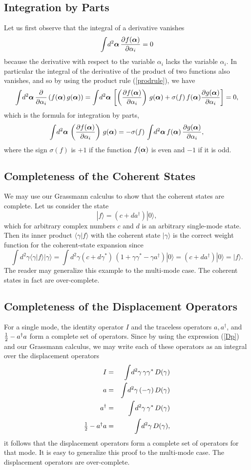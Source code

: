 \documentclass[12pt]{article}
\def\beq{\begin{equation}}
\def\eeq{\end{equation}}
\def\bea{\begin{eqnarray}}
\def\eea{\end{eqnarray}}
\def\p{\partial}
\def\a{\alpha}
\def\ba{{\mbox{\boldmath$\alpha$}}}
\def\ad{a^\dgr}
\def\c{\gamma}
\def\cs{\gamma^*}
\def\s{\sigma}
\def\dgr{\dagger}
\def\thalf{\textstyle{ {1 \over 2} } }
\def\G{Grassmann }
\def\cost{coherent state }
\def\costs{coherent states }
\def\co_st{coherent-state}
\def\disp{displacement }
\def\ops{operators }
\def\opsp{operators}
\begin{document}
\subsection{Integration by Parts}
Let us first observe that the 
integral of a derivative vanishes
\beq
\int \! d^2\ba \, \frac { \p f( \ba ) }{ \p \a_i } = 0 
\label {intofder0}
\eeq
because the derivative  with respect to 
the variable $ \a_i $ lacks the variable $ \a_i $.
In particular the integral of the derivative 
of the product of two functions also vanishes,
and so by using the product rule (\ref {prodrule}),
we have
\beq
\int \! d^2\ba \, \frac { \p }{ \p \a_i } \left( f( \ba ) 
\, g( \ba ) \right) = \int \! d^2\ba \, \left[
\left( \frac { \p f( \ba ) }{ \p \a_i } \right)
\, g( \ba ) + \s( f ) \,  f( \ba ) \frac { \p g( \ba ) }{ \p \a_i } 
\right] = 0 ,
\label {intofderp}
\eeq
which is the formula for integration by parts,
\beq
\int \! d^2\ba \, \left( \frac { \p f( \ba ) }{ \p \a_i } \right)
\, g( \ba ) =
- \s( f ) \, \int \! d^2\ba \,  f( \ba ) \,
\frac { \p g( \ba ) }{ \p \a_i } ,
\label {intbyparts}
\eeq
where the sign $ \s( f ) $ is $ +1 $ 
if the function $ f( \ba ) $ is even
and $ -1 $ if it is odd.

\subsection{Completeness of the Coherent States}
We may use our \G calculus to show that the
\costs are complete.  Let us consider the state 
\beq
| f \rangle = \left( c + d \ad \right) | 0 \rangle ,
\label {arbst}
\eeq
which for arbitrary complex numbers $ c $ and $ d $
is an arbitrary single-mode state.
Then its inner product $ \langle \c | f \rangle $
with the \cost $ | \c \rangle $ is the correct
weight function for the \co_st expansion
since
\beq
\int \! d^2\c \langle \c | f \rangle | \c \rangle =
\int \! d^2\c ( c + d \cs ) 
\, \left( 1 + \c \cs - \c \ad \right) | 0 \rangle 
= \left( c + d \ad \right) | 0 \rangle
= | f \rangle .
\label {co_stcompl}
\eeq
The reader may generalize this example to the
multi-mode case.  The coherent states in fact
are over-complete.

\subsection{Completeness of the Displacement Operators}
For a single mode, the identity operator $ I $ 
and the traceless \ops $ a, \ad $, 
and $ \thalf - \ad a $ form a complete set of \opsp.
Since by using the expression (\ref {Dp})
and our \G calculus,
we may write each of these \ops
as an integral over the \disp \ops
\bea
I & = & \int \! d^2\c \, \c \cs \, D( \c ) \label {DI} \\
a & = & \int \! d^2\c \, ( - \c ) \, D( \c ) \label {Da} \\
\ad & = & \int \! d^2\c \, \cs \, D( \c ) \label {Dad} \\
\thalf - \ad a & = & \int \! d^2\c \, D( \c ) ,
\label {Dada}
\eea
it follows that the \disp \ops
form a complete set of \ops for that mode.
It is easy to generalize this proof to the
multi-mode case.  The \disp \ops are over-complete.
\end{document}
